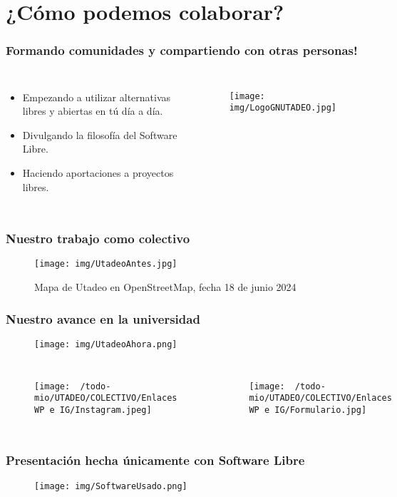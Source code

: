 \documentclass{beamer}
\begin{document}
\section{¿Cómo podemos colaborar?}

\begin{frame}
  \frametitle{Formando comunidades y compartiendo con otras personas!}
  \begin{columns}
    \centering
    \begin{itemize}
      \item Empezando a utilizar alternativas libres y abiertas en tú día a día.
      \item Divulgando la filosofía del Software Libre.
      \item Haciendo aportaciones a proyectos libres.
    \end{itemize}

    \begin{figure}[H]
      \centering
      \texttt{[image: img/LogoGNUTADEO.jpg]}
    \end{figure}
  \end{columns}
\end{frame}

\begin{frame}
  \centering
  \frametitle{Nuestro trabajo como colectivo}
  \begin{figure}[H]
    \centering
    \texttt{[image: img/UtadeoAntes.jpg]}
    \caption{Mapa de Utadeo en OpenStreetMap, fecha 18 de junio 2024}
  \end{figure}
\end{frame}

\begin{frame}
  \centering
  \frametitle{Nuestro avance en la universidad}
  \begin{figure}[H]
    \texttt{[image: img/UtadeoAhora.png]}
  \end{figure}
\end{frame}



\begin{frame}
  \begin{columns}
    \centering
    \begin{figure}[H]
      \centering
      \texttt{[image: ~/todo-mio/UTADEO/COLECTIVO/Enlaces WP e IG/Instagram.jpeg]}
    \end{figure}

    \begin{figure}[H]
      \centering
      \texttt{[image: ~/todo-mio/UTADEO/COLECTIVO/Enlaces WP e IG/Formulario.jpg]}
    \end{figure}
  \end{columns}
\end{frame}


\begin{frame}
  \centering
  \frametitle{Presentación hecha únicamente con Software Libre}
  \begin{figure}[H]
    \centering
    \texttt{[image: img/SoftwareUsado.png]}
  \end{figure}
\end{frame}
\end{document}

